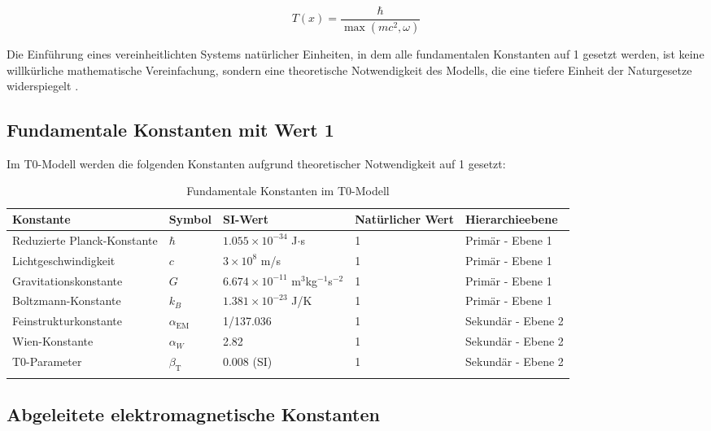 \documentclass[12pt,a4paper]{article}
\newcommand{\Tfield}{T(x)}
\newcommand{\alphaEM}{\alpha_{\text{EM}}}
\newcommand{\betaT}{\beta_{\text{T}}}
\begin{document}
	\begin{equation}
		\Tfield = \frac{\hbar}{\max(mc^2, \omega)}
	\end{equation}
	
	Die Einführung eines vereinheitlichten Systems natürlicher Einheiten, in dem alle fundamentalen Konstanten auf 1 gesetzt werden, ist keine willkürliche mathematische Vereinfachung, sondern eine theoretische Notwendigkeit des Modells, die eine tiefere Einheit der Naturgesetze widerspiegelt \cite{pascher_alphabeta_2025}.
	
	\subsection{Fundamentale Konstanten mit Wert 1}
	
	Im T0-Modell werden die folgenden Konstanten aufgrund theoretischer Notwendigkeit auf 1 gesetzt:
	
	\begin{table}[h]
		\centering
		\begin{adjustbox}{scale=0.75}
			\begin{tabular}{lllll}
				\hline
				\textbf{Konstante} & \textbf{Symbol} & \textbf{SI-Wert} & \textbf{Natürlicher Wert} & \textbf{Hierarchieebene} \\
				\hline
				Reduzierte Planck-Konstante & $\hbar$ & $1.055 \times 10^{-34}$ J$\cdot$s & 1 & Primär - Ebene 1 \\
				Lichtgeschwindigkeit & $c$ & $3 \times 10^8$ m/s & 1 & Primär - Ebene 1 \\
				Gravitationskonstante & $G$ & $6.674 \times 10^{-11}$ m$^3$kg$^{-1}$s$^{-2}$ & 1 & Primär - Ebene 1 \\
				Boltzmann-Konstante & $k_B$ & $1.381 \times 10^{-23}$ J/K & 1 & Primär - Ebene 1 \\
				Feinstrukturkonstante & $\alphaEM$ & 1/137.036 & 1 & Sekundär - Ebene 2 \\
				Wien-Konstante & $\alpha_W$ & 2.82 & 1 & Sekundär - Ebene 2 \\
				T0-Parameter & $\betaT$ & 0.008 (SI) & 1 & Sekundär - Ebene 2 \\
				\hline
				\multicolumn{4}{c}{} \\
				\hline
			\end{tabular}
		\end{adjustbox}
		\caption{Fundamentale Konstanten im T0-Modell}
		\label{tab:fund_const}
	\end{table}
	
	\subsection{Abgeleitete elektromagnetische Konstanten}
	
\end{document}
